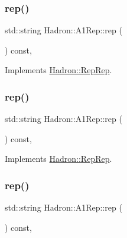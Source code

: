 \subsubsection{\texorpdfstring{rep()}{rep()}\hspace{0.1cm}{\footnotesize\ttfamily [1/5]}}
{\footnotesize\ttfamily std\+::string Hadron\+::\+A1\+Rep\+::rep (\begin{DoxyParamCaption}{ }\end{DoxyParamCaption}) const\hspace{0.3cm}{\ttfamily [inline]}, {\ttfamily [virtual]}}



Implements \mbox{\hyperlink{structHadron_1_1RepRep_ab3213025f6de249f7095892109575fde}{Hadron\+::\+Rep\+Rep}}.

\mbox{\label{structHadron_1_1A1Rep_a6b592d902063cfea9bd1cedcdeb9ac79}} 
\subsubsection{\texorpdfstring{rep()}{rep()}\hspace{0.1cm}{\footnotesize\ttfamily [2/5]}}
{\footnotesize\ttfamily std\+::string Hadron\+::\+A1\+Rep\+::rep (\begin{DoxyParamCaption}{ }\end{DoxyParamCaption}) const\hspace{0.3cm}{\ttfamily [inline]}, {\ttfamily [virtual]}}



Implements \mbox{\hyperlink{structHadron_1_1RepRep_ab3213025f6de249f7095892109575fde}{Hadron\+::\+Rep\+Rep}}.

\mbox{\label{structHadron_1_1A1Rep_a6b592d902063cfea9bd1cedcdeb9ac79}} 
\subsubsection{\texorpdfstring{rep()}{rep()}\hspace{0.1cm}{\footnotesize\ttfamily [3/5]}}
{\footnotesize\ttfamily std\+::string Hadron\+::\+A1\+Rep\+::rep (\begin{DoxyParamCaption}{ }\end{DoxyParamCaption}) const\hspace{0.3cm}{\ttfamily [inline]}, {\ttfamily [virtual]}}



